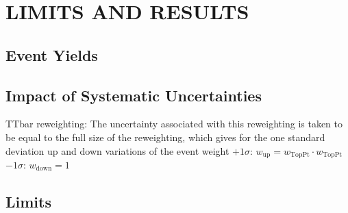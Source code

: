 %
%
%


\chapter{\texorpdfstring{\uppercase {Limits and Results}}{Limits and Results}}
\label{ch:results}

\section{Event Yields}
\section{Impact of Systematic Uncertainties}

TTbar reweighting:
The uncertainty associated with this reweighting is taken to be equal to the full size of the reweighting, which gives
for the one standard deviation up and down variations of the event weight
$+1\sigma$: $w_{\mathrm{up}}=w_{\mathrm{TopPt}}{\cdot}w_{\mathrm{TopPt}}$
$-1\sigma$: $w_{\mathrm{down}}=1$


\section{Limits}

\begin{comment}
begin{figure}[!hbt]
	\centering
	\begin{subfigure}[t]{0.46\textwidth}
		\texttt{[image: \\figpath/Chapter4/2015\_08\_01\_combinedSM\_KinMEBDT\_StatsOnly.pdf]}
		\label{fig:limits_stats_only}
	\end{subfigure}
	\begin{subfigure}[t]{0.46\textwidth}
		\texttt{[image: \\figpath/Chapter4/2015\_08\_01\_combinedSM\_KinMEBDT.pdf]}
		\label{fig:limits_with_sys}
	\end{subfigure}
	\caption{Expected 95\% upper confidence level on the Higgs signal strength (left) without including systematic uncertainties and (right) with systematic uncertainties included. The median combined limit is found to be 2.01 without systematics and 3.48 with them.}
	\label{fig:limits}
\end{figure}
\end{comment}